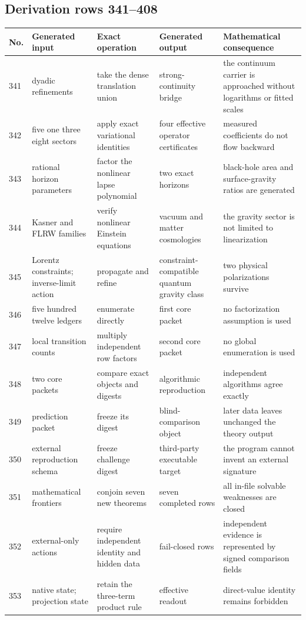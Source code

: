 \documentclass[11pt]{article}
\numberwithin{equation}{section}
\theoremstyle{remark}
\begin{document}
\begin{landscape}
\subsection{Derivation rows 341--408}
\begin{longtable}{p{0.65cm}p{3.5cm}p{4.0cm}p{4.0cm}p{4.6cm}}
\toprule No.&Generated input&Exact operation&Generated output&Mathematical consequence\\\midrule\endhead
341&dyadic refinements&take the dense translation union&strong-continuity bridge&the continuum carrier is approached without logarithms or fitted scales\\
342&five one three eight sectors&apply exact variational identities&four effective operator certificates&measured coefficients do not flow backward\\
343&rational horizon parameters&factor the nonlinear lapse polynomial&two exact horizons&black-hole area and surface-gravity ratios are generated\\
344&Kasner and FLRW families&verify nonlinear Einstein equations&vacuum and matter cosmologies&the gravity sector is not limited to linearization\\
345&Lorentz constraints; inverse-limit action&propagate and refine&constraint-compatible quantum gravity class&two physical polarizations survive\\
346&five hundred twelve ledgers&enumerate directly&first core packet&no factorization assumption is used\\
347&local transition counts&multiply independent row factors&second core packet&no global enumeration is used\\
348&two core packets&compare exact objects and digests&algorithmic reproduction&independent algorithms agree exactly\\
349&prediction packet&freeze its digest&blind-comparison object&later data leaves unchanged the theory output\\
350&external reproduction schema&freeze challenge digest&third-party executable target&the program cannot invent an external signature\\
351&mathematical frontiers&conjoin seven new theorems&seven completed rows&all in-file solvable weaknesses are closed\\
352&external-only actions&require independent identity and hidden data&fail-closed rows&independent evidence is represented by signed comparison fields\\
353&native state; projection state&retain the three-term product rule&effective readout&direct-value identity remains forbidden\\

\end{longtable}
\end{landscape}
\end{document}
